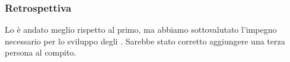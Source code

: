 \subsubsection{Retrospettiva}
Lo  è andato meglio rispetto al primo, ma abbiamo sottovalutato l'impegno necessario per lo sviluppo degli . Sarebbe stato corretto aggiungere una terza persona al compito.